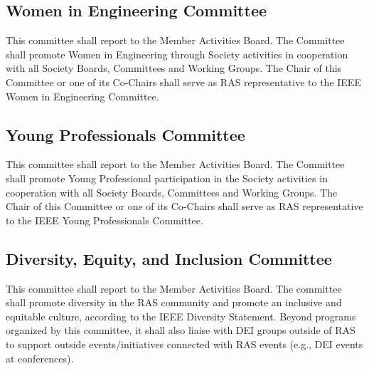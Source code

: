 \documentclass[10pt]{article}
\begin{document}
\subsection{Women in Engineering Committee}

This committee shall report to the Member Activities Board. The Committee shall promote Women in Engineering through Society activities in cooperation with all Society Boards, Committees and Working Groups. The Chair of this Committee or one of its Co-Chairs shall serve as RAS representative to the IEEE Women in Engineering Committee.


\subsection{Young Professionals Committee}

This committee shall report to the Member Activities Board. The Committee shall promote Young Professional participation in the Society activities in cooperation with all Society Boards, Committees and Working Groups. The Chair of this Committee or one of its Co-Chairs shall serve as RAS representative to the IEEE Young Professionals Committee.

\subsection{Diversity, Equity, and Inclusion Committee}
This committee shall report to the Member Activities Board. The committee shall promote diversity in the RAS community and promote an inclusive and equitable culture, according to the IEEE Diversity Statement. Beyond programs organized by this committee, it shall also liaise with DEI groups outside of RAS to support outside events/initiatives connected with RAS events (e.g., DEI events at conferences). 

\end{document}
